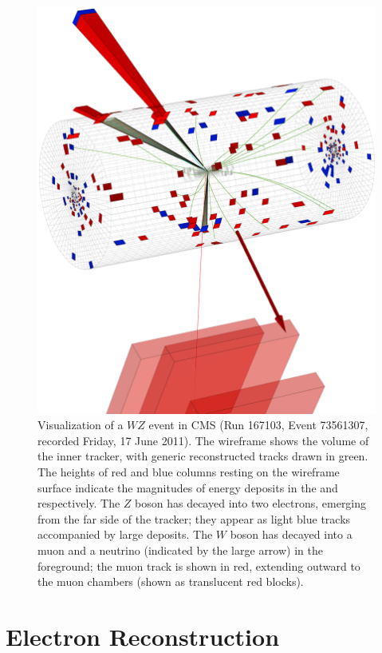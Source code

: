 \begin{figure}
  \centering
  \includegraphics[width=\plotwidth]{figures/167103.79.73561307.png}
  \caption[Visualization of a $WZ$ event in CMS]{Visualization of a $WZ$ event in CMS (Run 167103, Event 73561307, recorded Friday, 17 June 2011).  The wireframe shows the volume of the inner tracker, with generic reconstructed tracks drawn in green.  The heights of red and blue columns resting on the wireframe surface indicate the magnitudes of energy deposits in the \ecal and \hcal respectively.  The $Z$ boson has decayed into two electrons, emerging from the far side of the tracker; they appear as light blue tracks accompanied by large \ecal deposits.  The $W$ boson has decayed into a muon and a neutrino (indicated by the large \MET arrow) in the foreground; the muon track is shown in red, extending outward to the muon chambers (shown as translucent red blocks).}
  \label{fig:visualization}
\end{figure}


\section{Electron Reconstruction}

